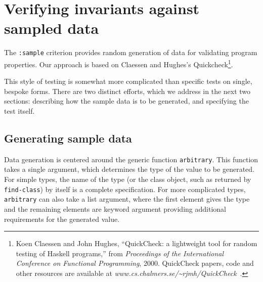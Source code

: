 
\section{Verifying invariants against sampled data}
\label{quickcheck}
The \texttt{:sample} criterion provides random generation of data for
validating program properties.  Our approach is based on Claessen and
Hughes's Quickcheck\footnote{Koen Claessen and John Hughes,
  ``QuickCheck: a lightweight tool for random testing of Haskell
  programs,'' from \emph{Proceedings of the International Conference
    on Functional Programming}, 2000.  QuickCheck papers, code and
  other resources are available at
  \textsl{www.cs.chalmers.se/\~{}rjmh/QuickCheck}~.}.

This style of testing is somewhat more complicated than specific tests
on single, bespoke forms.  There are two distinct efforts, which we
address in the next two sections: describing how the sample data is to
be generated, and specifying the test itself.

\subsection{Generating sample data}
\label{sec:quickcheck-data}
Data generation is centered around the generic function
\texttt{arbitrary}.  This function takes a single argument, which
determines the type of the value to be generated.  For simple types,
the name of the type (or the class object, such as returned by
\texttt{find-class}) by itself is a complete specification.  For more
complicated types, \texttt{arbitrary} can also take a list argument,
where the first element gives the type and the remaining elements are
keyword argument providing additional requirements for the generated
value.

